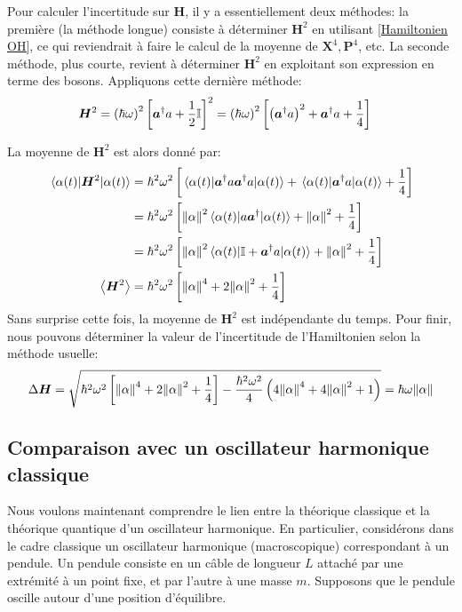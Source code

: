 \documentclass[11pt,oneside,a4paper]{article}
\newcommand{\h}{\ensuremath{\hbar}}
\begin{document}
Pour calculer l'incertitude sur $\bm{H}$, il y a essentiellement deux méthodes: la première (la méthode longue) consiste à déterminer $\bm{H}^2$ en utilisant \eqref{Hamiltonien OH}, ce qui reviendrait à faire le calcul de la moyenne de $\bm{X}^4,\bm{P}^4$, etc. La seconde méthode, plus courte, revient à déterminer $\bm{H}^2$ en exploitant son expression en terme des bosons. Appliquons cette dernière méthode:
\begin{align}
  \bm{H}^2 = \left(\h\omega\right)^2\left[\bm{a}^\dagger a+\frac{1}{2}\mathbb{I}\right]^2 &= \left(\h\omega\right)^2\left[\left(\bm{a}^\dagger a\right)^2+\bm{a}^\dagger a+\frac{1}{4}\right]\notag
\end{align}

La moyenne de $\bm{H}^2$ est alors donné par:
\begin{align*}
  \expval{\bm{H}^2}{\alpha(t)} &= \h^2\omega^2\left[\expval{\bm{a}^\dagger a \bm{a}^\dagger a}{\alpha(t)}+\expval{\bm{a}^\dagger a}{\alpha(t)}+\frac{1}{4}\right]\\
  &= \h^2\omega^2\left[\norm{\alpha}^2\expval{a\bm{a}^\dagger}{\alpha(t)}+\norm{\alpha}^2+\frac{1}{4}\right]\\
  &= \h^2\omega^2\left[\norm{\alpha}^2\expval{\mathbb{I}+\bm{a}^\dagger a}{\alpha(t)}+\norm{\alpha}^2+\frac{1}{4}\right]\\
  \expval{\bm{H}^2}&= \h^2\omega^2\left[\norm{\alpha}^4+2\norm{\alpha}^2+\frac{1}{4}\right]
\end{align*}
Sans surprise cette fois, la moyenne de $\bm{H}^2$ est indépendante du temps. Pour finir, nous pouvons déterminer la valeur de l'incertitude de l'Hamiltonien selon la méthode usuelle:
\begin{align}
  \label{delta H}
  \Delta \bm{H} = \sqrt{\h^2\omega^2\left[\norm{\alpha}^4+2\norm{\alpha}^2+\frac{1}{4}\right]-\frac{\h^2\omega^2}{4}\left(4\norm{\alpha}^4+4\norm{\alpha}^2+1\right)} = \h\omega\norm{\alpha}
\end{align}

\subsection{Comparaison avec un oscillateur harmonique classique}
Nous voulons maintenant comprendre le lien entre la théorique classique et la théorique quantique d'un oscillateur harmonique. En particulier, considérons dans le cadre classique un oscillateur harmonique (macroscopique) correspondant à un pendule. Un pendule consiste en un câble de longueur $L$ attaché par une extrémité à un point fixe, et par l'autre à une masse $m$. Supposons que le pendule oscille autour d'une position d'équilibre.\\
\end{document}
